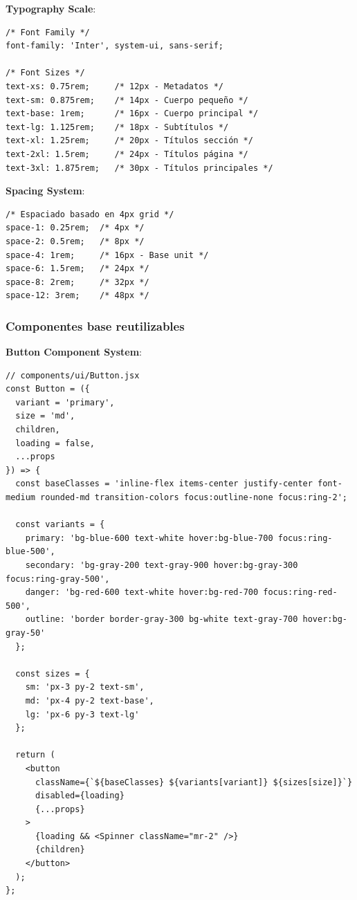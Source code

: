 \documentclass[12pt,a4paper,oneside]{report}
\begin{document}
\textbf{Typography Scale}:

\begin{lstlisting}
/* Font Family */
font-family: 'Inter', system-ui, sans-serif;

/* Font Sizes */
text-xs: 0.75rem;     /* 12px - Metadatos */
text-sm: 0.875rem;    /* 14px - Cuerpo pequeño */
text-base: 1rem;      /* 16px - Cuerpo principal */
text-lg: 1.125rem;    /* 18px - Subtítulos */
text-xl: 1.25rem;     /* 20px - Títulos sección */
text-2xl: 1.5rem;     /* 24px - Títulos página */
text-3xl: 1.875rem;   /* 30px - Títulos principales */
\end{lstlisting}

\textbf{Spacing System}:

\begin{lstlisting}
/* Espaciado basado en 4px grid */
space-1: 0.25rem;  /* 4px */
space-2: 0.5rem;   /* 8px */
space-4: 1rem;     /* 16px - Base unit */
space-6: 1.5rem;   /* 24px */
space-8: 2rem;     /* 32px */
space-12: 3rem;    /* 48px */
\end{lstlisting}

\subsubsection{Componentes base
reutilizables}\label{componentes-base-reutilizables}

\textbf{Button Component System}:

\begin{lstlisting}
// components/ui/Button.jsx
const Button = ({ 
  variant = 'primary', 
  size = 'md', 
  children, 
  loading = false,
  ...props 
}) => {
  const baseClasses = 'inline-flex items-center justify-center font-medium rounded-md transition-colors focus:outline-none focus:ring-2';
  
  const variants = {
    primary: 'bg-blue-600 text-white hover:bg-blue-700 focus:ring-blue-500',
    secondary: 'bg-gray-200 text-gray-900 hover:bg-gray-300 focus:ring-gray-500',
    danger: 'bg-red-600 text-white hover:bg-red-700 focus:ring-red-500',
    outline: 'border border-gray-300 bg-white text-gray-700 hover:bg-gray-50'
  };
  
  const sizes = {
    sm: 'px-3 py-2 text-sm',
    md: 'px-4 py-2 text-base',
    lg: 'px-6 py-3 text-lg'
  };
  
  return (
    <button 
      className={`${baseClasses} ${variants[variant]} ${sizes[size]}`}
      disabled={loading}
      {...props}
    >
      {loading && <Spinner className="mr-2" />}
      {children}
    </button>
  );
};
\end{lstlisting}
\end{document}
